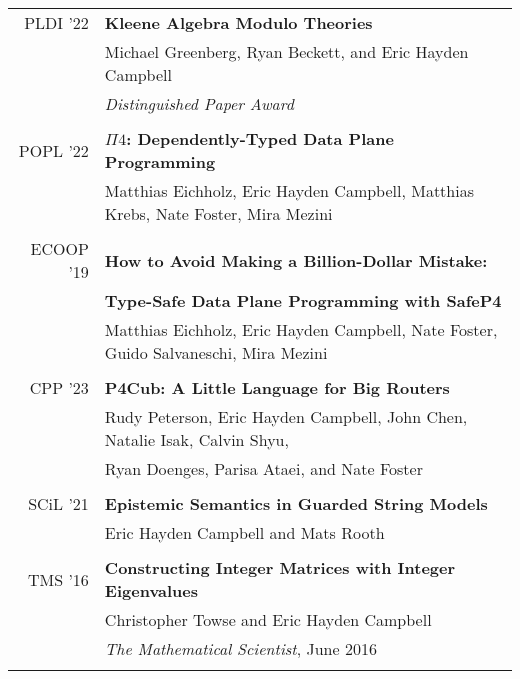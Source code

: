 \documentclass[letterpaper,1pt,oneside]{article}
\begin{document}
\begin{tabular}{>{\quad}r l}
  PLDI '22 & \textbf{Kleene Algebra Modulo Theories} \\
  & Michael Greenberg, Ryan Beckett, and Eric Hayden Campbell \\
  & \textit{Distinguished Paper Award} \\
  &\\

  POPL '22 & \textbf{$\Pi4$: Dependently-Typed Data Plane Programming} \\
  & Matthias Eichholz, Eric Hayden Campbell, Matthias Krebs, Nate Foster, Mira Mezini \\
  & \\

  ECOOP '19 & \textbf{How to Avoid Making a Billion-Dollar Mistake:}\\
  & \textbf{Type-Safe Data Plane Programming with SafeP4} \\
  & Matthias Eichholz, Eric Hayden Campbell, Nate Foster, Guido Salvaneschi, Mira Mezini \\
  & \\

  CPP '23 & \textbf{P4Cub: A Little Language for Big Routers} \\
  & Rudy Peterson, Eric Hayden Campbell, John Chen, Natalie Isak, Calvin Shyu, \\
  & Ryan Doenges, Parisa Ataei, and Nate Foster \\
  & \\

  SCiL '21 & \textbf{Epistemic Semantics in Guarded String Models}\\
  & Eric Hayden Campbell and Mats Rooth \\
  & \\


  TMS '16 & \textbf{Constructing Integer Matrices with Integer Eigenvalues} \\
  & Christopher Towse and Eric Hayden Campbell \\
  & \textit{The Mathematical Scientist}, June 2016 \\
  & \\

\end{tabular}
\end{document}
